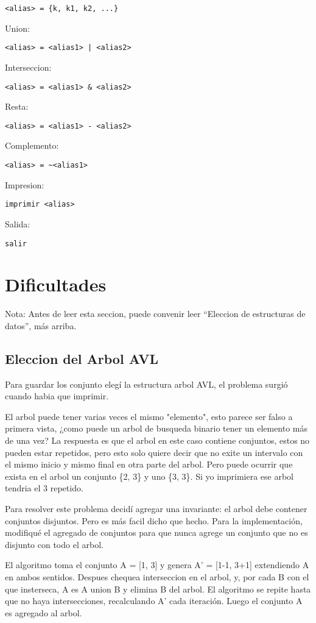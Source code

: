 \documentclass{article}
\begin{document}
	\verb|<alias> = {k, k1, k2, ...}|
	
	\noindent Union:
	
	\verb'<alias> = <alias1> | <alias2>'
	
	\noindent Interseccion:
	
	\verb|<alias> = <alias1> & <alias2>|
	
	\noindent Resta:
	
	\verb|<alias> = <alias1> - <alias2>|
	
	\noindent Complemento:
	
    \verb|<alias> = ~<alias1>|
    
    \noindent Impresion:
    
	\verb|imprimir <alias>|
	
	\noindent Salida:
	
	\verb|salir|
	
	
	\section*{Dificultades}

	Nota: Antes de leer esta seccion, puede convenir leer ``Eleccion de estructuras de datos'', más arriba.

	\subsection*{Eleccion del Arbol AVL}

	Para guardar los conjunto elegí la estructura arbol AVL, el problema surgió cuando habia que imprimir. 
	
	El arbol puede tener varias veces el mismo "elemento", esto parece ser falso a primera vista, ¿como puede un arbol de busqueda binario tener un elemento más de una vez? La respuesta es que el arbol en este caso contiene conjuntos, estos no pueden estar repetidos, pero esto solo quiere decir que no exite un intervalo con el mismo inicio y mismo final en otra parte del arbol. Pero puede ocurrir que exista en el arbol un conjunto \{2, 3\} y uno \{3, 3\}. Si yo imprimiera ese arbol tendria el 3 repetido.
	
	Para resolver este problema decidí agregar una invariante: el arbol debe contener conjuntos disjuntos. Pero es más facil dicho que hecho. Para la implementación, modifiqué el agregado de conjuntos para que nunca agrege un conjunto que no es disjunto con todo el arbol.
	
	El algoritmo toma el conjunto A = [1, 3] y genera A' = [1-1, 3+1] extendiendo A en ambos sentidos. Despues chequea interseccion en el arbol, y, por cada B con el que insterseca, A es A union B y elimina B del arbol. El algoritmo se repite hasta que no haya intersecciones,  recalculando A' cada iteración. Luego el conjunto A es agregado al arbol.
\end{document}
